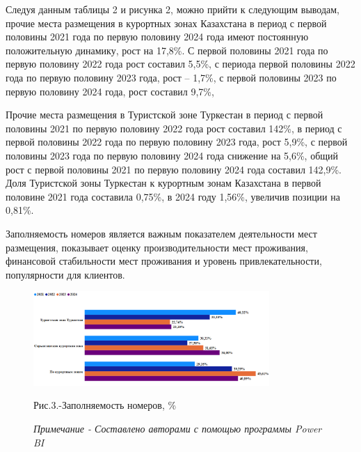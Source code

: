 \begin{multicols}{2}
Следуя данным таблицы 2 и рисунка 2, можно прийти к следующим выводам,
прочие места размещения в курортных зонах Казахстана в период с первой
половины 2021 года по первую половину 2024 года имеют постоянную
положительную динамику, рост на 17,8\%. С первой половины 2021 года по
первую половину 2022 года рост составил 5,5\%, с периода первой половины
2022 года по первую половину 2023 года, рост -- 1,7\%, с первой половины
2023 по первую половину 2024 года, рост составил 9,7\%,

Прочие места размещения в Туристской зоне Туркестан в период с первой
половины 2021 по первую половину 2022 года рост составил 142\%, в период
с первой половины 2022 года по первую половину 2023 года, рост 5,9\%, с
первой половины 2023 года по первую половину 2024 года снижение на
5,6\%, общий рост с первой половины 2021 по первую половину 2024 года
составил 142,9\%. Доля Туристской зоны Туркестан к курортным зонам
Казахстана в первой половине 2021 года составила 0,75\%, в 2024 году
1,56\%, увеличив позиции на 0,81\%.

Заполняемость номеров является важным показателем деятельности мест
размещения, показывает оценку производительности мест проживания,
финансовой стабильности мест проживания и уровень привлекательности,
популярности для клиентов.
\end{multicols}

\begin{figure}[H]
	\centering
	\includegraphics[width=0.8\textwidth]{media/ekon/image5}
	\caption*{Рис.3.-Заполняемость номеров, \%}
	\caption*{\emph{Примечание - Составлено авторами с помощью программы Power BI}}
\end{figure}

